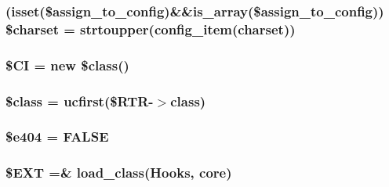 \subsubsection[{\$charset}]{ (isset(\$assign\+\_\+to\+\_\+config)\&\&is\+\_\+array(\$assign\+\_\+to\+\_\+config)) \$charset = strtoupper(config\+\_\+item(\textquotesingle{}charset\textquotesingle{}))}\label{_code_igniter_8php_acf3a97185c56fefd63af2d2af8676bd9}
\hypertarget{_code_igniter_8php_ae0314d046ddf7fcfaec03222977427d3}{}
\subsubsection[{\$\+C\+I}]{\setlength{\rightskip}{0pt plus 5cm}\$C\+I = new \$class()}\label{_code_igniter_8php_ae0314d046ddf7fcfaec03222977427d3}
\hypertarget{_code_igniter_8php_a252ba022809910ea710a068fc1bab657}{}
\subsubsection[{\$class}]{\setlength{\rightskip}{0pt plus 5cm}\$class = ucfirst(\$R\+T\+R-\/$>$class)}\label{_code_igniter_8php_a252ba022809910ea710a068fc1bab657}
\hypertarget{_code_igniter_8php_a20b89fa011927fc498a4a665fa44d061}{}
\subsubsection[{\$e404}]{\setlength{\rightskip}{0pt plus 5cm}\$e404 = F\+A\+L\+S\+E}\label{_code_igniter_8php_a20b89fa011927fc498a4a665fa44d061}
\hypertarget{_code_igniter_8php_ab97aae9bc0aae04b84d360a29a3c035b}{}
\subsubsection[{\$\+E\+X\+T}]{\setlength{\rightskip}{0pt plus 5cm}\$E\+X\+T =\& load\+\_\+class(\textquotesingle{}Hooks\textquotesingle{}, \textquotesingle{}core\textquotesingle{})}\label{_code_igniter_8php_ab97aae9bc0aae04b84d360a29a3c035b}
\hypertarget{_code_igniter_8php_a66d076d48aff75a01bb726f5bdd94d46}{}
